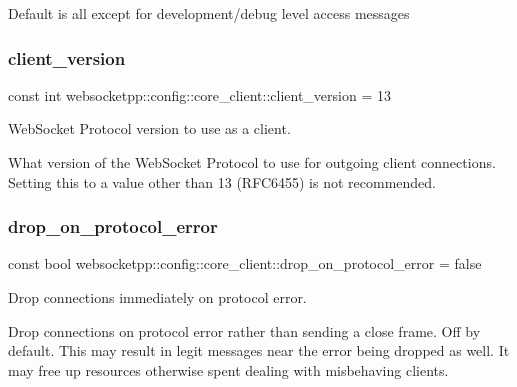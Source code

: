 Default is all except for development/debug level access messages \mbox{\label{structwebsocketpp_1_1config_1_1core__client_afa438e9269e4bd4bc3815979e0de0083}} 
\subsubsection{\texorpdfstring{client\+\_\+version}{client\_version}}
{\footnotesize\ttfamily const int websocketpp\+::config\+::core\+\_\+client\+::client\+\_\+version = 13\hspace{0.3cm}{\ttfamily [static]}}



Web\+Socket Protocol version to use as a client. 

What version of the Web\+Socket Protocol to use for outgoing client connections. Setting this to a value other than 13 (R\+F\+C6455) is not recommended. \mbox{\label{structwebsocketpp_1_1config_1_1core__client_aa43f6d2b983e0d8feb5e0bc1d9ad1be9}} 
\subsubsection{\texorpdfstring{drop\+\_\+on\+\_\+protocol\+\_\+error}{drop\_on\_protocol\_error}}
{\footnotesize\ttfamily const bool websocketpp\+::config\+::core\+\_\+client\+::drop\+\_\+on\+\_\+protocol\+\_\+error = false\hspace{0.3cm}{\ttfamily [static]}}



Drop connections immediately on protocol error. 

Drop connections on protocol error rather than sending a close frame. Off by default. This may result in legit messages near the error being dropped as well. It may free up resources otherwise spent dealing with misbehaving clients. \mbox{\label{structwebsocketpp_1_1config_1_1core__client_a653fda222bcedbaff664e60a517d0fa9}} 
